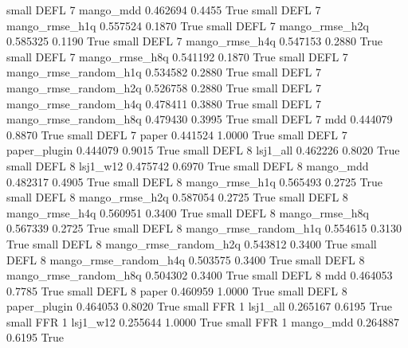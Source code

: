      small     DEFL                 7             mango_mdd   0.462694      0.4455    True
     small     DEFL                 7        mango_rmse_h1q   0.557524      0.1870    True
     small     DEFL                 7        mango_rmse_h2q   0.585325      0.1190    True
     small     DEFL                 7        mango_rmse_h4q   0.547153      0.2880    True
     small     DEFL                 7        mango_rmse_h8q   0.541192      0.1870    True
     small     DEFL                 7 mango_rmse_random_h1q   0.534582      0.2880    True
     small     DEFL                 7 mango_rmse_random_h2q   0.526758      0.2880    True
     small     DEFL                 7 mango_rmse_random_h4q   0.478411      0.3880    True
     small     DEFL                 7 mango_rmse_random_h8q   0.479430      0.3995    True
     small     DEFL                 7                   mdd   0.444079      0.8870    True
     small     DEFL                 7                 paper   0.441524      1.0000    True
     small     DEFL                 7          paper_plugin   0.444079      0.9015    True
     small     DEFL                 8              lsj1_all   0.462226      0.8020    True
     small     DEFL                 8              lsj1_w12   0.475742      0.6970    True
     small     DEFL                 8             mango_mdd   0.482317      0.4905    True
     small     DEFL                 8        mango_rmse_h1q   0.565493      0.2725    True
     small     DEFL                 8        mango_rmse_h2q   0.587054      0.2725    True
     small     DEFL                 8        mango_rmse_h4q   0.560951      0.3400    True
     small     DEFL                 8        mango_rmse_h8q   0.567339      0.2725    True
     small     DEFL                 8 mango_rmse_random_h1q   0.554615      0.3130    True
     small     DEFL                 8 mango_rmse_random_h2q   0.543812      0.3400    True
     small     DEFL                 8 mango_rmse_random_h4q   0.503575      0.3400    True
     small     DEFL                 8 mango_rmse_random_h8q   0.504302      0.3400    True
     small     DEFL                 8                   mdd   0.464053      0.7785    True
     small     DEFL                 8                 paper   0.460959      1.0000    True
     small     DEFL                 8          paper_plugin   0.464053      0.8020    True
     small      FFR                 1              lsj1_all   0.265167      0.6195    True
     small      FFR                 1              lsj1_w12   0.255644      1.0000    True
     small      FFR                 1             mango_mdd   0.264887      0.6195    True
